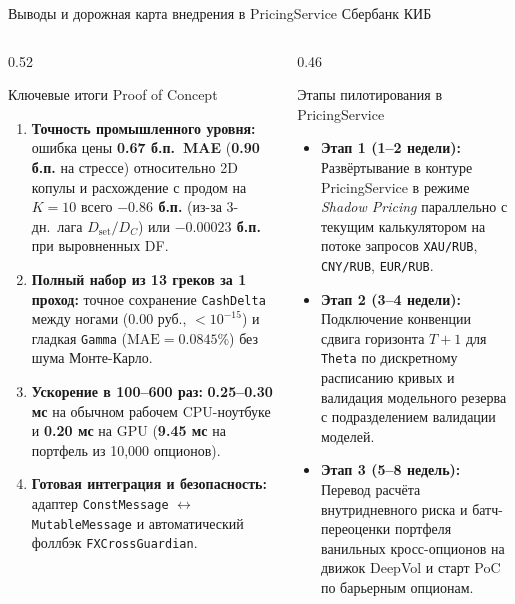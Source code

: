 \documentclass[aspectratio=169, 9pt]{beamer}
\begin{document}
\begin{frame}{Выводы и дорожная карта внедрения в PricingService Сбербанк КИБ}
  \begin{columns}[T]
    \begin{column}{0.52\textwidth}
      \begin{block}{Ключевые итоги Proof of Concept}
        \begin{enumerate}
          \item \textbf{Точность промышленного уровня:} ошибка цены \textbf{0.67 б.п.\ MAE} (\textbf{0.90 б.п.} на стрессе) относительно 2D копулы и расхождение с продом на $K=10$ всего \textbf{$-0.86$ б.п.} (из-за 3-дн.\ лага $D_{\text{set}}/D_C$) или \textbf{$-0.00023$ б.п.} при выровненных DF.
          \item \textbf{Полный набор из 13 греков за 1 проход:} точное сохранение \texttt{CashDelta} между ногами ($0.00$ руб., $< 10^{-15}$) и гладкая \texttt{Gamma} ($\text{MAE} = 0.0845\%$) без шума Монте-Карло.
          \item \textbf{Ускорение в 100--600 раз:} \textbf{0.25--0.30 мс} на обычном рабочем CPU-ноутбуке и \textbf{0.20 мс} на GPU (\textbf{9.45 мс} на портфель из 10,000 опционов).
          \item \textbf{Готовая интеграция и безопасность:} адаптер \texttt{ConstMessage} $\leftrightarrow$ \texttt{MutableMessage} и автоматический фоллбэк \texttt{FXCrossGuardian}.
        \end{enumerate}
      \end{block}
    \end{column}

    \begin{column}{0.46\textwidth}
      \begin{exampleblock}{Этапы пилотирования в PricingService}
        \begin{itemize}
          \item \textbf{Этап 1 (1--2 недели):} Развёртывание в контуре PricingService в режиме \textit{Shadow Pricing} параллельно с текущим калькулятором на потоке запросов \texttt{XAU/RUB}, \texttt{CNY/RUB}, \texttt{EUR/RUB}.
          \item \textbf{Этап 2 (3--4 недели):} Подключение конвенции сдвига горизонта $T+1$ для \texttt{Theta} по дискретному расписанию кривых и валидация модельного резерва с подразделением валидации моделей.
          \item \textbf{Этап 3 (5--8 недель):} Перевод расчёта внутридневного риска и батч-переоценки портфеля ванильных кросс-опционов на движок DeepVol и старт PoC по барьерным опционам.
        \end{itemize}
      \end{exampleblock}


\end{column}
\end{columns}
\end{frame}
\end{document}
